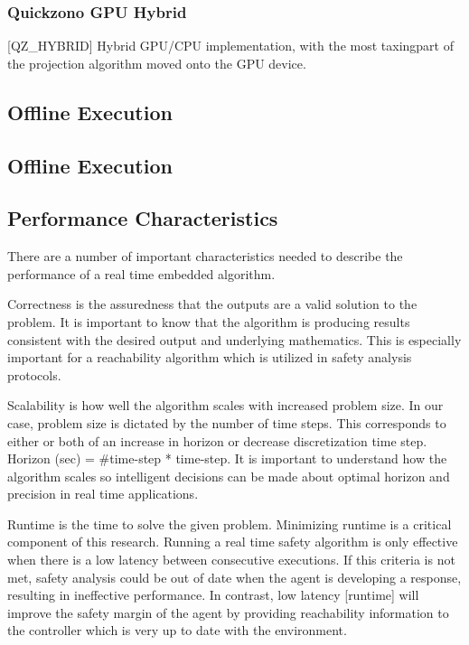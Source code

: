 \documentclass[runningheads]{llncs}
\begin{document}
\subsubsection{Quickzono GPU Hybrid} [QZ\_HYBRID] \newline Hybrid GPU/CPU implementation, with the most taxing\newline part of the projection algorithm moved onto the GPU device. \\

\subsection{Offline Execution}
\subsection{Offline Execution}
\subsection{Performance Characteristics}
There are a number of important characteristics needed to describe the performance of a real time embedded algorithm.

Correctness is the assuredness that the outputs are a valid solution to the problem. It is important to know that the algorithm is producing results consistent with the desired output and underlying mathematics. This is especially important for a reachability algorithm which is utilized in safety analysis protocols.

Scalability is how well the algorithm scales with increased problem size. In our case, problem size is dictated by the number of time steps. This corresponds to either or both of an increase in horizon or decrease discretization time step. Horizon (sec) = \#time-step * time-step. It is important to understand how the algorithm scales so intelligent decisions can be made about optimal horizon and precision in real time applications.

Runtime is the time to solve the given problem. Minimizing runtime is a critical component of this research. Running a real time safety algorithm is only effective when there is a low latency between consecutive executions. If this criteria is not met, safety analysis could be out of date when the agent is developing a response, resulting in ineffective performance. In contrast, low latency [runtime] will improve the safety margin of the agent by providing reachability information to the controller which is very up to date with the environment.
\end{document}
